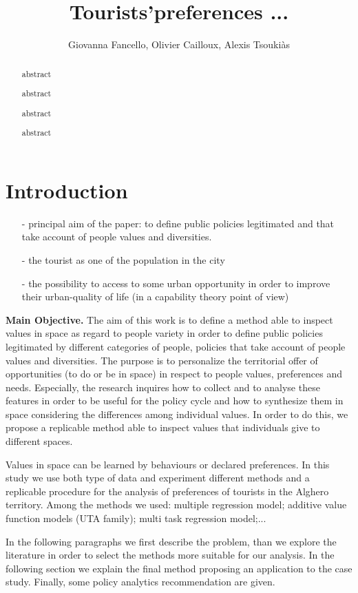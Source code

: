 \documentclass[a4paper]{article}
\author{Giovanna Fancello, Olivier Cailloux, Alexis Tsoukiàs}
\title{Tourists'preferences ...}
\begin{document}
\maketitle
\begin{abstract}
abstract

abstract

abstract

abstract
\end{abstract}

\tableofcontents

\section{Introduction}
\begin{itemize}
   \item [-]principal aim of the paper: to define public policies legitimated and that take account of people values and diversities.
   \item [-]the tourist as one of the population in the city
   \item [-]the possibility to access to some urban opportunity in order to improve their urban-quality of life (in a capability theory point of view)
 \end{itemize}

\textbf{Main Objective.}
The aim of this work is to define a method able to inspect values in space as regard to people variety in order to define public policies legitimated by different categories of people, policies that take account of people values and diversities. The purpose is to personalize the territorial offer of opportunities (to do or be in space) in respect to people values, preferences and needs. Especially, the research inquires how to collect and to analyse these features in order to be useful for the policy cycle and how to synthesize them in space considering the differences among individual values. In order to do this, we propose a replicable method able to inspect values that individuals give to different spaces.

Values in space can be learned by behaviours or declared preferences. 
In this study we use both type of data and experiment different methods and a replicable procedure for the analysis of preferences of tourists in the Alghero territory. Among the methods we used: multiple regression model; additive value function models (UTA family); multi task regression model;...

In the following paragraphs we first describe the problem, than we explore the literature in order to select the methods more suitable for our analysis. In the following section we explain the final method proposing an application to the case study. Finally, some policy analytics recommendation are given.
\end{document}
